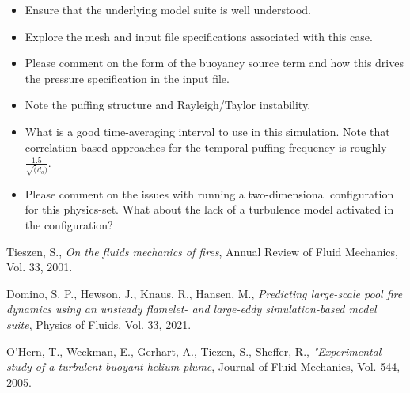 \documentclass{article}
\begin{document}
\begin{itemize}
	\item Ensure that the underlying model suite is well understood.
	\item Explore the mesh and input file specifications associated 
          with this case.
        \item Please comment on the form of the buoyancy source term and
          how this drives the pressure specification in the input file.
	\item Note the puffing structure and Rayleigh/Taylor instability.
	\item What is a good time-averaging interval to use in this 
          simulation. Note that correlation-based approaches for the 
          temporal puffing frequency is roughly 
          $\frac{1.5}{\sqrt(d_o)}$.
        \item Please comment on the issues with running a two-dimensional 
          configuration for this physics-set. What about the lack of 
          a turbulence model activated in the configuration?
\end{itemize}

\begin{thebibliography}{100}

 Tieszen, S., \emph{On the fluids mechanics of fires}, Annual Review of Fluid Mechanics, Vol. 33, 2001.

 Domino, S. P., Hewson, J., Knaus, R., Hansen, M., \emph{Predicting large-scale pool fire dynamics using an unsteady flamelet- and large-eddy simulation-based model suite}, Physics of Fluids, Vol. 33, 2021.

 O'Hern, T., Weckman, E., Gerhart, A., Tiezen, S.,  Sheffer, R., \emph{"Experimental study of a turbulent buoyant helium plume}, Journal of Fluid Mechanics, Vol. 544, 2005.

\end{thebibliography}
\end{document}
